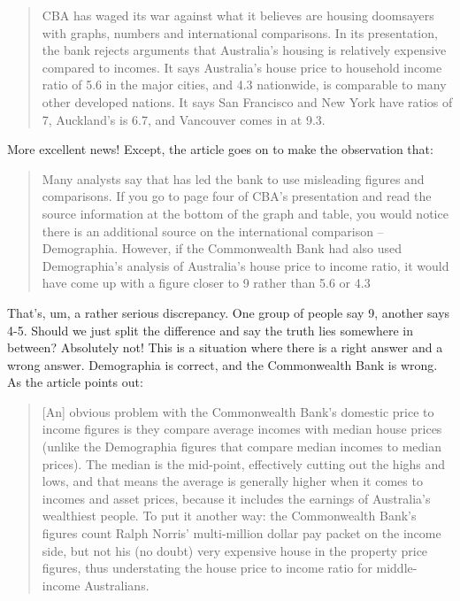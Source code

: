 \documentclass[
]{book}
\begin{document}
\begin{quote}
CBA has waged its war against what it believes are housing doomsayers with graphs, numbers and international comparisons. In its presentation, the bank rejects arguments that Australia's housing is relatively expensive compared to incomes. It says Australia's house price to household income ratio of 5.6 in the major cities, and 4.3 nationwide, is comparable to many other developed nations. It says San Francisco and New York have ratios of 7, Auckland's is 6.7, and Vancouver comes in at 9.3.
\end{quote}

More excellent news! Except, the article goes on to make the observation that:

\begin{quote}
Many analysts say that has led the bank to use misleading figures and comparisons. If you go to page four of CBA's presentation and read the source information at the bottom of the graph and table, you would notice there is an additional source on the international comparison -- Demographia. However, if the Commonwealth Bank had also used Demographia's analysis of Australia's house price to income ratio, it would have come up with a figure closer to 9 rather than 5.6 or 4.3
\end{quote}

That's, um, a rather serious discrepancy. One group of people say 9, another says 4-5. Should we just split the difference and say the truth lies somewhere in between? Absolutely not! This is a situation where there is a right answer and a wrong answer. Demographia is correct, and the Commonwealth Bank is wrong. As the article points out:

\begin{quote}
{[}An{]} obvious problem with the Commonwealth Bank's domestic price to income figures is they compare average incomes with median house prices (unlike the Demographia figures that compare median incomes to median prices). The median is the mid-point, effectively cutting out the highs and lows, and that means the average is generally higher when it comes to incomes and asset prices, because it includes the earnings of Australia's wealthiest people. To put it another way: the Commonwealth Bank's figures count Ralph Norris' multi-million dollar pay packet on the income side, but not his (no doubt) very expensive house in the property price figures, thus understating the house price to income ratio for middle-income Australians.
\end{quote}
\end{document}
